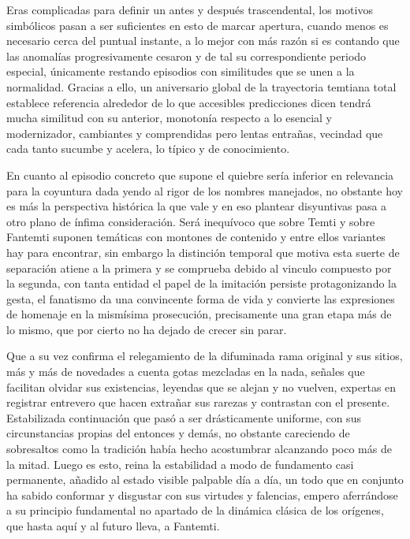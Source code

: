\documentclass[
]{book}
\begin{document}
Eras complicadas para definir un antes y después trascendental, los motivos simbólicos pasan a ser suficientes en esto de marcar apertura, cuando menos es necesario cerca del puntual instante, a lo mejor con más razón si es contando que las anomalías progresivamente cesaron y de tal su correspondiente periodo especial, únicamente restando episodios con similitudes que se unen a la normalidad. Gracias a ello, un aniversario global de la trayectoria temtiana total establece referencia alrededor de lo que accesibles predicciones dicen tendrá mucha similitud con su anterior, monotonía respecto a lo esencial y modernizador, cambiantes y comprendidas pero lentas entrañas, vecindad que cada tanto sucumbe y acelera, lo típico y de conocimiento.

En cuanto al episodio concreto que supone el quiebre sería inferior en relevancia para la coyuntura dada yendo al rigor de los nombres manejados, no obstante hoy es más la perspectiva histórica la que vale y en eso plantear disyuntivas pasa a otro plano de ínfima consideración. Será inequívoco que sobre Temti y sobre Fantemti suponen temáticas con montones de contenido y entre ellos variantes hay para encontrar, sin embargo la distinción temporal que motiva esta suerte de separación atiene a la primera y se comprueba debido al vinculo compuesto por la segunda, con tanta entidad el papel de la imitación persiste protagonizando la gesta, el fanatismo da una convincente forma de vida y convierte las expresiones de homenaje en la mismísima prosecución, precisamente una gran etapa más de lo mismo, que por cierto no ha dejado de crecer sin parar.

Que a su vez confirma el relegamiento de la difuminada rama original y sus sitios, más y más de novedades a cuenta gotas mezcladas en la nada, señales que facilitan olvidar sus existencias, leyendas que se alejan y no vuelven, expertas en registrar entrevero que hacen extrañar sus rarezas y contrastan con el presente. Estabilizada continuación que pasó a ser drásticamente uniforme, con sus circunstancias propias del entonces y demás, no obstante careciendo de sobresaltos como la tradición había hecho acostumbrar alcanzando poco más de la mitad. Luego es esto, reina la estabilidad a modo de fundamento casi permanente, añadido al estado visible palpable día a día, un todo que en conjunto ha sabido conformar y disgustar con sus virtudes y falencias, empero aferrándose a su principio fundamental no apartado de la dinámica clásica de los orígenes, que hasta aquí y al futuro lleva, a Fantemti.
\end{document}
